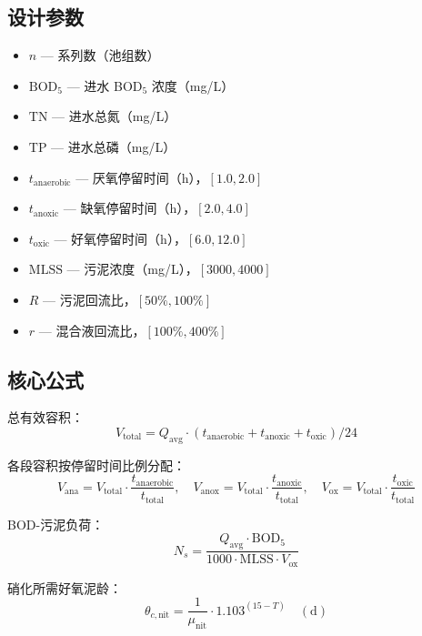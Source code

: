 \documentclass[12pt,a4paper]{ctexart}
\begin{document}
\subsection{设计参数}
\begin{itemize}
  \item $n$ — 系列数（池组数）
  \item $\text{BOD}_5$ — 进水 BOD$_5$ 浓度（mg/L）
  \item $\text{TN}$ — 进水总氮（mg/L）
  \item $\text{TP}$ — 进水总磷（mg/L）
  \item $t_{\text{anaerobic}}$ — 厌氧停留时间（h），$[1.0, 2.0]$
  \item $t_{\text{anoxic}}$ — 缺氧停留时间（h），$[2.0, 4.0]$
  \item $t_{\text{oxic}}$ — 好氧停留时间（h），$[6.0, 12.0]$
  \item $\text{MLSS}$ — 污泥浓度（mg/L），$[3000, 4000]$
  \item $R$ — 污泥回流比，$[50\%, 100\%]$
  \item $r$ — 混合液回流比，$[100\%, 400\%]$
\end{itemize}

\subsection{核心公式}
总有效容积：
\begin{equation}
V_{\text{total}} = Q_{\text{avg}} \cdot (t_{\text{anaerobic}} + t_{\text{anoxic}} + t_{\text{oxic}}) / 24
\end{equation}

各段容积按停留时间比例分配：
\begin{equation}
V_{\text{ana}} = V_{\text{total}} \cdot \frac{t_{\text{anaerobic}}}{t_{\text{total}}}, \quad
V_{\text{anox}} = V_{\text{total}} \cdot \frac{t_{\text{anoxic}}}{t_{\text{total}}}, \quad
V_{\text{ox}} = V_{\text{total}} \cdot \frac{t_{\text{oxic}}}{t_{\text{total}}}
\end{equation}

BOD-污泥负荷：
\begin{equation}
N_s = \frac{Q_{\text{avg}} \cdot \text{BOD}_5}{1000 \cdot \text{MLSS} \cdot V_{\text{ox}}}
\end{equation}

硝化所需好氧泥龄：
\begin{equation}
\theta_{c,\text{nit}} = \frac{1}{\mu_{\text{nit}}} \cdot 1.103^{(15-T)} \quad (\text{d})
\end{equation}
\end{document}
